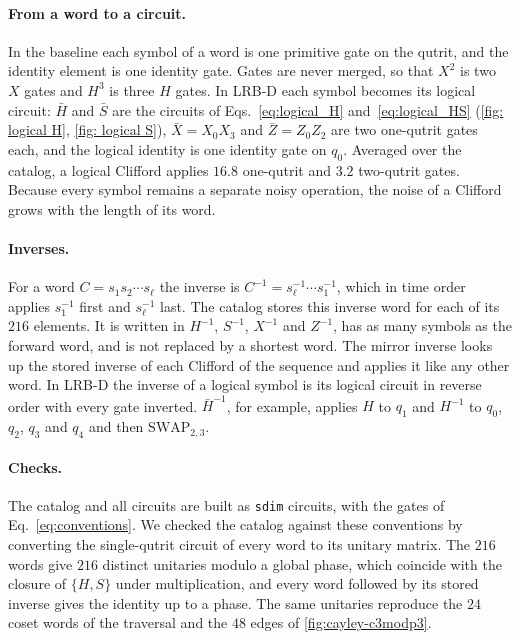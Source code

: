 \paragraph{From a word to a circuit.}
In the baseline each symbol of a word is one primitive gate on the qutrit, and the identity element is one identity gate. Gates are never merged, so that $X^2$ is two $X$ gates and $H^3$ is three $H$ gates. In LRB-D each symbol becomes its logical circuit: $\bar{H}$ and $\bar{S}$ are the circuits of Eqs.~\eqref{eq:logical_H} and~\eqref{eq:logical_HS} (\autoref{fig: logical H}, \autoref{fig: logical S}), $\bar{X} = X_0 X_3$ and $\bar{Z} = Z_0 Z_2$ are two one-qutrit gates each, and the logical identity is one identity gate on $q_0$. Averaged over the catalog, a logical Clifford applies $16.8$ one-qutrit and $3.2$ two-qutrit gates. Because every symbol remains a separate noisy operation, the noise of a Clifford grows with the length of its word.

\paragraph{Inverses.}
For a word $C = s_1 s_2 \cdots s_\ell$ the inverse is $C^{-1} = s_\ell^{-1} \cdots s_1^{-1}$, which in time order applies $s_1^{-1}$ first and $s_\ell^{-1}$ last. The catalog stores this inverse word for each of its $216$ elements. It is written in $H^{-1}$, $S^{-1}$, $X^{-1}$ and $Z^{-1}$, has as many symbols as the forward word, and is not replaced by a shortest word. The mirror inverse looks up the stored inverse of each Clifford of the sequence and applies it like any other word. In LRB-D the inverse of a logical symbol is its logical circuit in reverse order with every gate inverted. $\bar{H}^{-1}$, for example, applies $H$ to $q_1$ and $H^{-1}$ to $q_0$, $q_2$, $q_3$ and $q_4$ and then $\mathrm{SWAP}_{2,3}$.

\paragraph{Checks.}
The catalog and all circuits are built as \texttt{sdim} circuits, with the gates of Eq.~\eqref{eq:conventions}. We checked the catalog against these conventions by converting the single-qutrit circuit of every word to its unitary matrix. The $216$ words give $216$ distinct unitaries modulo a global phase, which coincide with the closure of $\{H, S\}$ under multiplication, and every word followed by its stored inverse gives the identity up to a phase. The same unitaries reproduce the $24$ coset words of the traversal and the $48$ edges of \autoref{fig:cayley-c3modp3}.

